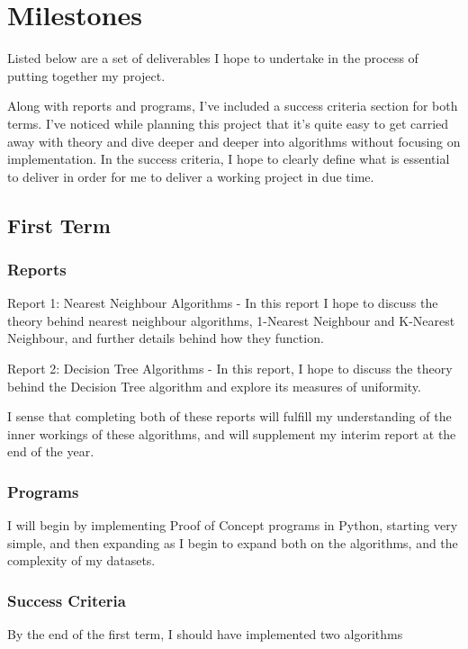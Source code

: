 \documentclass[report,10pt]{article}
\begin{document}
\pagebreak


\section{Milestones}
Listed below are a set of deliverables I hope to undertake in the process of putting together my project. \par 
Along with reports and programs, I've included a success criteria section for both terms. I've noticed while planning this project that it's quite easy to get carried away with theory and dive deeper and deeper into algorithms without focusing on implementation. In the success criteria, I hope to clearly define what is essential to deliver in order for me to deliver a working project in due time. 
\subsection{First Term}
\subsubsection{Reports}
Report 1: Nearest Neighbour Algorithms - In this report I hope to discuss the theory behind nearest neighbour algorithms, 1-Nearest Neighbour and K-Nearest Neighbour, and further details behind how they function. \par 
Report 2: Decision Tree Algorithms - In this report, I hope to discuss the theory behind the Decision Tree algorithm and explore its measures of uniformity. \par
I sense that completing both of these reports will fulfill my understanding of the inner workings of these algorithms, and will supplement my interim report at the end of the year. \par

\subsubsection{Programs}
I will begin by implementing Proof of Concept programs in Python, starting very simple, and then expanding as I begin to expand both on the algorithms, and the complexity of my datasets.

\subsubsection{Success Criteria}
By the end of the first term, I should have implemented two algorithms
\end{document}
